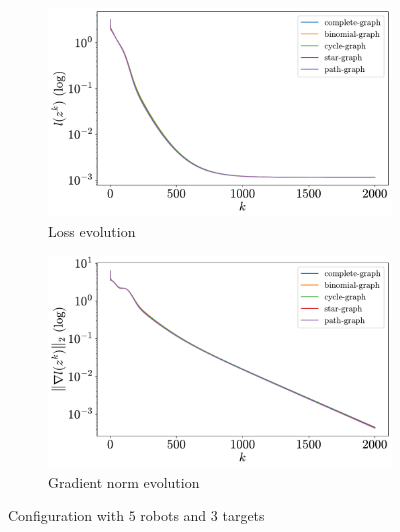 \documentclass[a4paper,11pt,oneside]{book}
\begin{document}
\begin{figure}[H]
      \centering
      \begin{subfigure}[t]{0.49\textwidth}
            \centering
            \includegraphics[width=\linewidth]{./figs/tracking/loss_5_3_2_2000.pdf} 
            \caption{Loss evolution}
      \end{subfigure}
      \hfill
      \begin{subfigure}[t]{0.49\textwidth}
            \centering
            \includegraphics[width=\linewidth]{./figs/tracking/gradient_5_3_2_2000.pdf} 
            \caption{Gradient norm evolution}
      \end{subfigure}
      \caption{Configuration with $5$ robots and $3$ targets}
      \label{fig:tracking_5_3}
\end{figure}
\end{document}
